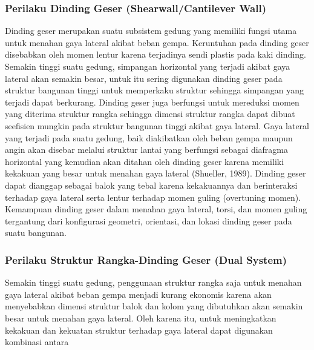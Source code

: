 \documentclass[../modul_skb.tex]{subfiles}
\begin{document}
\subsubsection{Perilaku Dinding Geser (Shearwall/Cantilever Wall)}%
\label{ssub:Perilaku Dinding Geser (Shearwall/Cantilever Wall)}


Dinding geser merupakan suatu subsistem gedung yang memiliki fungsi utama untuk menahan gaya lateral akibat beban gempa. Keruntuhan pada dinding geser disebabkan oleh momen lentur karena terjadinya sendi plastis pada kaki dinding. Semakin tinggi suatu gedung, simpangan horizontal yang terjadi akibat gaya lateral akan semakin besar, untuk itu sering digunakan dinding geser pada struktur bangunan tinggi untuk memperkaku struktur sehingga simpangan yang terjadi dapat berkurang. Dinding geser juga berfungsi untuk mereduksi momen yang diterima struktur rangka sehingga dimensi struktur rangka dapat dibuat seefisien mungkin pada struktur bangunan tinggi akibat gaya lateral.
Gaya lateral yang terjadi pada suatu gedung, baik diakibatkan oleh beban gempa maupun angin akan disebar melalui struktur lantai yang berfungsi sebagai diafragma horizontal yang kemudian akan ditahan oleh dinding geser karena memiliki kekakuan yang besar untuk menahan gaya lateral (Shueller, 1989). Dinding geser dapat dianggap sebagai balok yang tebal karena kekakuannya dan berinteraksi terhadap gaya lateral serta lentur terhadap momen guling (overtuning momen). Kemampuan dinding geser dalam menahan gaya lateral, torsi, dan momen guling tergantung dari konfigurasi geometri, orientasi, dan lokasi dinding geser pada suatu bangunan.

\subsubsection{Perilaku Struktur Rangka-Dinding Geser (Dual System)}%
\label{ssub:Perilaku Struktur Rangka-Dinding Geser (Dual System)}

Semakin tinggi suatu gedung, penggunaan struktur rangka saja untuk menahan gaya lateral akibat beban gempa menjadi kurang ekonomis karena akan menyebabkan dimensi struktur balok dan kolom yang dibutuhkan akan semakin besar untuk menahan gaya lateral. Oleh karena itu, untuk meningkatkan kekakuan dan kekuatan struktur terhadap gaya lateral dapat digunakan kombinasi antara
\end{document}
